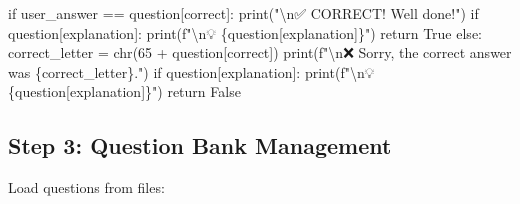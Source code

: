 \documentclass[
  letterpaper,
  DIV=11,
  numbers=noendperiod,
  oneside]{scrreprt}
\newenvironment{Shaded}{}{}
\newcommand{\BuiltInTok}[1]{\textcolor[rgb]{0.84,0.23,0.29}{#1}}
\newcommand{\CharTok}[1]{\textcolor[rgb]{0.01,0.18,0.38}{#1}}
\newcommand{\ControlFlowTok}[1]{\textcolor[rgb]{0.84,0.23,0.29}{#1}}
\newcommand{\DecValTok}[1]{\textcolor[rgb]{0.00,0.36,0.77}{#1}}
\newcommand{\NormalTok}[1]{\textcolor[rgb]{0.14,0.16,0.18}{#1}}
\newcommand{\OperatorTok}[1]{\textcolor[rgb]{0.14,0.16,0.18}{#1}}
\newcommand{\SpecialCharTok}[1]{\textcolor[rgb]{0.00,0.36,0.77}{#1}}
\newcommand{\SpecialStringTok}[1]{\textcolor[rgb]{0.01,0.18,0.38}{#1}}
\newcommand{\StringTok}[1]{\textcolor[rgb]{0.01,0.18,0.38}{#1}}
\newcommand{\VariableTok}[1]{\textcolor[rgb]{0.89,0.38,0.04}{#1}}
\begin{document}
\begin{Shaded}
\begin{Highlighting}[]
    \ControlFlowTok{if}\NormalTok{ user\_answer }\OperatorTok{==}\NormalTok{ question[}\StringTok{\textquotesingle{}correct\textquotesingle{}}\NormalTok{]:}
        \BuiltInTok{print}\NormalTok{(}\StringTok{"}\CharTok{\textbackslash{}n}\StringTok{✅ CORRECT! Well done!"}\NormalTok{)}
        \ControlFlowTok{if}\NormalTok{ question[}\StringTok{\textquotesingle{}explanation\textquotesingle{}}\NormalTok{]:}
            \BuiltInTok{print}\NormalTok{(}\SpecialStringTok{f"}\CharTok{\textbackslash{}n}\SpecialStringTok{💡 }\SpecialCharTok{\{}\NormalTok{question[}\StringTok{\textquotesingle{}explanation\textquotesingle{}}\NormalTok{]}\SpecialCharTok{\}}\SpecialStringTok{"}\NormalTok{)}
        \ControlFlowTok{return} \VariableTok{True}
    \ControlFlowTok{else}\NormalTok{:}
\NormalTok{        correct\_letter }\OperatorTok{=} \BuiltInTok{chr}\NormalTok{(}\DecValTok{65} \OperatorTok{+}\NormalTok{ question[}\StringTok{\textquotesingle{}correct\textquotesingle{}}\NormalTok{])}
        \BuiltInTok{print}\NormalTok{(}\SpecialStringTok{f"}\CharTok{\textbackslash{}n}\SpecialStringTok{❌ Sorry, the correct answer was }\SpecialCharTok{\{}\NormalTok{correct\_letter}\SpecialCharTok{\}}\SpecialStringTok{."}\NormalTok{)}
        \ControlFlowTok{if}\NormalTok{ question[}\StringTok{\textquotesingle{}explanation\textquotesingle{}}\NormalTok{]:}
            \BuiltInTok{print}\NormalTok{(}\SpecialStringTok{f"}\CharTok{\textbackslash{}n}\SpecialStringTok{💡 }\SpecialCharTok{\{}\NormalTok{question[}\StringTok{\textquotesingle{}explanation\textquotesingle{}}\NormalTok{]}\SpecialCharTok{\}}\SpecialStringTok{"}\NormalTok{)}
        \ControlFlowTok{return} \VariableTok{False}
\end{Highlighting}
\end{Shaded}

\subsection{Step 3: Question Bank
Management}\label{step-3-question-bank-management}

Load questions from files:
\end{document}
